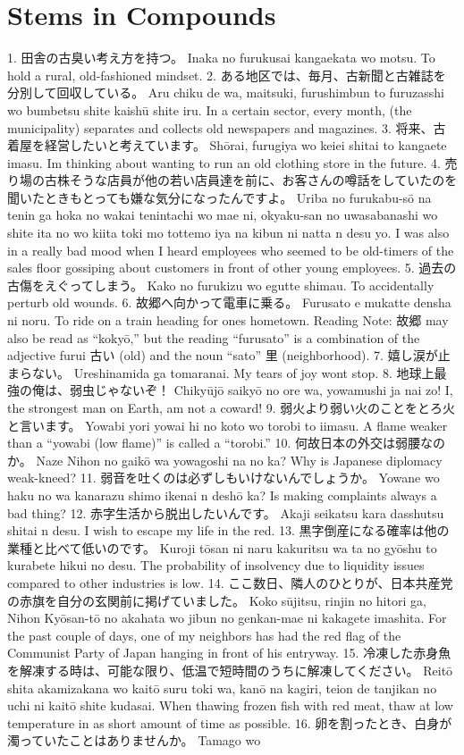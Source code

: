\section{Stems in Compounds}
 1. 田舎の古臭い考え方を持つ。 Inaka no furukusai kangaekata wo motsu. To hold a rural, old-fashioned mindset. 2. ある地区では、毎月、古新聞と古雑誌を分別して回収している。 Aru chiku de wa, maitsuki, furushimbun to furuzasshi wo bumbetsu shite kaishū shite iru. In a certain sector, every month, (the municipality) separates and collects old newspapers and magazines. 3. 将来、古着屋を経営したいと考えています。 Shōrai, furugiya wo keiei shitai to kangaete imasu. I\textquotesingle m thinking about wanting to run an old clothing store in the future. 4. 売り場の古株そうな店員が他の若い店員達を前に、お客さんの噂話をしていたのを聞いたときもとっても嫌な気分になったんですよ。 Uriba no furukabu-sō na ten\textquotesingle in ga hoka no wakai ten\textquotesingle intachi wo mae ni, okyaku-san no uwasabanashi wo shite ita no wo kiita toki mo tottemo iya na kibun ni natta n desu yo. I was also in a really bad mood when I heard employees who seemed to be old-timers of the sales floor gossiping about customers in front of other young employees. 5. 過去の古傷をえぐってしまう。 Kako no furukizu wo egutte shimau. To accidentally perturb old wounds. 6. 故郷へ向かって電車に乗る。 Furusato e mukatte densha ni noru. To ride on a train heading for one\textquotesingle s hometown. Reading Note: 故郷 may also be read as “kokyō,” but the reading “furusato” is a combination of the adjective furui 古い (old) and the noun “sato” 里 (neighborhood). 7. 嬉し涙が止まらない。 Ureshinamida ga tomaranai. My tears of joy won\textquotesingle t stop. 8. 地球上最強の俺は、弱虫じゃないぞ！ Chikyūjō saikyō no ore wa, yowamushi ja nai zo! I, the strongest man on Earth, am not a coward! 9. 弱火より弱い火のことをとろ火と言います。 Yowabi yori yowai hi no koto wo torobi to iimasu. A flame weaker than a “yowabi (low flame)” is called a “torobi.” 10. 何故日本の外交は弱腰なのか。 Naze Nihon no gaikō wa yowagoshi na no ka? Why is Japanese diplomacy weak-kneed? 11. 弱音を吐くのは必ずしもいけないんでしょうか。 Yowane wo haku no wa kanarazu shimo ikenai n deshō ka? Is making complaints always a bad thing? 12. 赤字生活から脱出したいんです。 Akaji seikatsu kara dasshutsu shitai n desu. I wish to escape my life in the red. 13. 黒字倒産になる確率は他の業種と比べて低いのです。 Kuroji tōsan ni naru kakuritsu wa ta no gyōshu to kurabete hikui no desu. The probability of insolvency due to liquidity issues compared to other industries is low. 14. ここ数日、隣人のひとりが、日本共産党の赤旗を自分の玄関前に掲げていました。 Koko sūjitsu, rinjin no hitori ga, Nihon Kyōsan-tō no akahata wo jibun no genkan-mae ni kakagete imashita. For the past couple of days, one of my neighbors has had the red flag of the Communist Party of Japan hanging in front of his entryway. 15. 冷凍した赤身魚を解凍する時は、可能な限り、低温で短時間のうちに解凍してください。 Reitō shita akamizakana wo kaitō suru toki wa, kanō na kagiri, teion de tanjikan no uchi ni kaitō shite kudasai. When thawing frozen fish with red meat, thaw at low temperature in as short amount of time as possible. 16. 卵を割ったとき、白身が濁っていたことはありませんか。 Tamago wo 